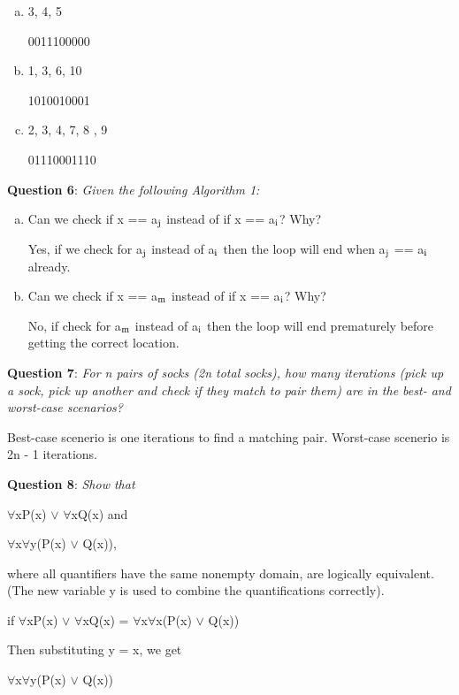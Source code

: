 \documentclass{article} %
\newcommand{\question}[2][]{\begin{flushleft}
        \textbf{Question #1}: \textit{#2}

\end{flushleft}}
\begin{document}
  \begin{enumerate}[a)]
    \item {3, 4, 5}
    
    0011100000
    \item {1, 3, 6, 10}
    
    1010010001
    \item {2, 3, 4, 7, 8 , 9}
    
    01110001110
    
  \end{enumerate}

  \question[6]{Given the following Algorithm 1: }

  \begin{enumerate}[a)]
    \item{Can we check if x == a$\textsubscript{j}$ instead of if x == a$\textsubscript{i}$? Why?}
    
    Yes, if we check for a$\textsubscript{j}$ instead of a$\textsubscript{i}$ then the loop will end when a$\textsubscript{j}$ == a$\textsubscript{i}$ already.

    \item {Can we check if x == a$\textsubscript{m}$ instead of if x == a$\textsubscript{i}$? Why?}
    
    No, if check for a$\textsubscript{m}$ instead of a$\textsubscript{i}$ then the loop will end prematurely before getting the correct location.
    
  \end{enumerate}

  \question[7]{For n pairs of socks (2n total socks), how many iterations (pick up a sock, pick up another and check if they match to pair them) are in the best- and worst-case scenarios?}

  Best-case scenerio is one iterations to find a matching pair. Worst-case scenerio is 2n - 1 iterations.

  \question[8]{Show that}

  $\forall$xP(x) $\lor$ $\forall$xQ(x) and

  $\forall$x$\forall$y(P(x) $\lor$ Q(x)),
  
  where all quantifiers have the same nonempty domain, are logically equivalent. (The new variable y is used
  to combine the quantifications correctly).

  if $\forall$xP(x) $\lor$ $\forall$xQ(x) = $\forall$x$\forall$x(P(x) $\lor$ Q(x))

  Then substituting y = x, we get

  $\forall$x$\forall$y(P(x) $\lor$ Q(x))
\end{document}
